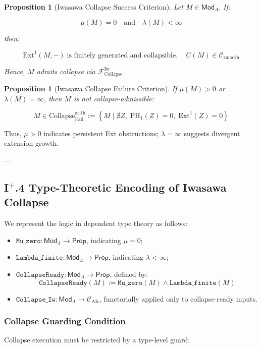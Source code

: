 \documentclass[11pt]{article}
\newtheorem{proposition}[theorem]{Proposition}
\begin{document}
\begin{proposition}[Iwasawa Collapse Success Criterion]
Let $M \in \mathsf{Mod}_\Lambda$. If:

\[
\mu(M) = 0 \quad \text{and} \quad \lambda(M) < \infty
\]

then:

\[
\mathrm{Ext}^1(M, -) \;\text{is finitely generated and collapsible},\quad C(M) \in \mathcal{C}_{\mathrm{smooth}}
\]

Hence, $M$ admits collapse via $\mathcal{F}_{\mathrm{Collapse}}^{\mathrm{Iw}}$.
\end{proposition}

\begin{proposition}[Iwasawa Collapse Failure Criterion]
If $\mu(M) > 0$ or $\lambda(M) = \infty$, then $M$ is not collapse-admissible:

\[
M \in \mathrm{Collapse}_{\mathrm{Fail}}^{\mathrm{arith}} := \left\{ M \mid \nexists Z,\; \mathrm{PH}_1(Z) = 0,\; \mathrm{Ext}^1(Z) = 0 \right\}
\]
\end{proposition}

Thus, $\mu > 0$ indicates persistent Ext obstructions; $\lambda = \infty$ suggests divergent extension growth.

---

\subsection*{I$^{+}$.4 Type-Theoretic Encoding of Iwasawa Collapse}

We represent the logic in dependent type theory as follows:

\begin{itemize}
    \item $\texttt{Mu\_zero} : \mathsf{Mod}_\Lambda \to \mathsf{Prop}$, indicating $\mu = 0$;
    \item $\texttt{Lambda\_finite} : \mathsf{Mod}_\Lambda \to \mathsf{Prop}$, indicating $\lambda < \infty$;
    \item $\texttt{CollapseReady} : \mathsf{Mod}_\Lambda \to \mathsf{Prop}$, defined by:
\[
\texttt{CollapseReady}(M) := \texttt{Mu\_zero}(M) \land \texttt{Lambda\_finite}(M)
\]
    \item $\texttt{Collapse\_Iw} : \mathsf{Mod}_\Lambda \to \mathcal{C}_{\mathrm{AK}}$, functorially applied only to collapse-ready inputs.
\end{itemize}

\subsubsection*{Collapse Guarding Condition}
Collapse execution must be restricted by a type-level guard:
\end{document}
